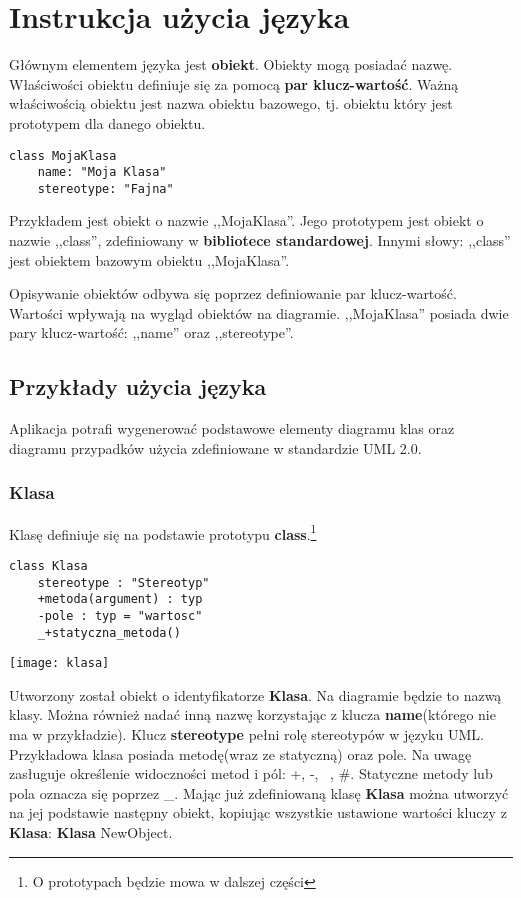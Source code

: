\section{Instrukcja użycia języka}

Głównym elementem języka jest \textbf{obiekt}. Obiekty mogą posiadać nazwę. Właściwości obiektu definiuje się za pomocą \textbf{par klucz-wartość}. Ważną właściwością obiektu jest nazwa obiektu bazowego, tj. obiektu który jest prototypem dla danego obiektu.

\begin{lstlisting}
class MojaKlasa
	name: "Moja Klasa"
	stereotype: "Fajna"
\end{lstlisting}

Przykładem jest obiekt o nazwie ,,MojaKlasa''. Jego prototypem jest obiekt o nazwie ,,class'', zdefiniowany w \textbf{bibliotece standardowej}. Innymi słowy: ,,class'' jest obiektem bazowym obiektu ,,MojaKlasa''.

Opisywanie obiektów odbywa się poprzez definiowanie par klucz-wartość. Wartości wpływają na wygląd obiektów na diagramie. ,,MojaKlasa'' posiada dwie pary klucz-wartość: ,,name'' oraz ,,stereotype''.

\subsection{Przykłady użycia języka}

Aplikacja potrafi wygenerować podstawowe elementy diagramu klas oraz diagramu przypadków użycia zdefiniowane w standardzie UML 2.0.

\subsubsection{Klasa}

Klasę definiuje się na podstawie prototypu \textbf{class}.\footnote{O prototypach będzie mowa w dalszej części}

\begin{lstlisting}
class Klasa
    stereotype : "Stereotyp"
    +metoda(argument) : typ
    -pole : typ = "wartosc"
    _+statyczna_metoda()
\end{lstlisting}

\begin{center}
\texttt{[image: klasa]}
\end{center}

Utworzony został obiekt o identyfikatorze \textbf{Klasa}. Na diagramie będzie to nazwą klasy. Można również nadać inną nazwę korzystając z klucza \textbf{name}(którego nie ma w przykładzie). Klucz \textbf{stereotype} pełni rolę stereotypów w języku UML. Przykładowa klasa posiada metodę(wraz ze statyczną) oraz pole. Na uwagę zasługuje określenie widoczności metod i pól: +, -, ~, \#. Statyczne metody lub pola oznacza się poprzez \_.
Mając już zdefiniowaną klasę \textbf{Klasa} można utworzyć na jej podstawie następny obiekt, kopiując wszystkie ustawione wartości kluczy z \textbf{Klasa}: \textbf{Klasa} NewObject.

